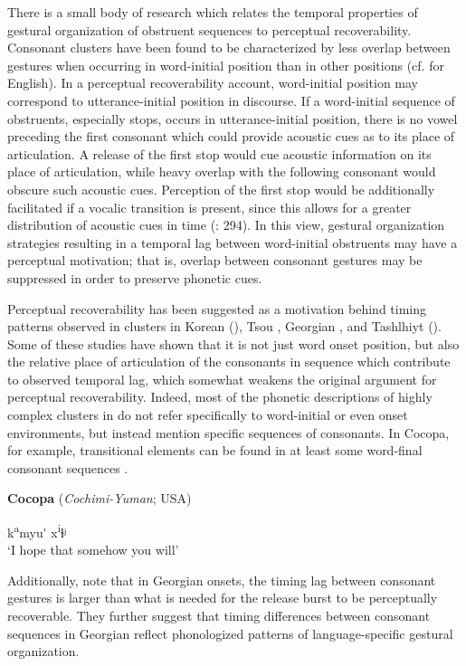   There is a small body of research which relates the temporal properties of gestural organization of obstruent sequences to perceptual recoverability. Consonant clusters have been found to be characterized by less overlap between gestures when occurring in word-initial position than in other positions (cf. \citealt{Byrd1996a} for English). In a perceptual recoverability account, word-initial position may correspond to utterance-initial position in discourse. If a word-initial sequence of obstruents, especially stops, occurs in utterance-initial position, there is no vowel preceding the first consonant which could provide acoustic cues as to its place of articulation. A release of the first stop would cue acoustic information on its place of articulation, while heavy overlap with the following consonant would obscure such acoustic cues. Perception of the first stop would be additionally facilitated if a vocalic transition is present, since this allows for a greater distribution of acoustic cues in time (\citealt{RidouaneFougeron2011}: 294). In this view, gestural organization strategies resulting in a temporal lag between word-initial obstruents may have a perceptual motivation; that is, overlap between consonant gestures may be suppressed in order to preserve phonetic cues.

  Perceptual recoverability has been suggested as a motivation behind timing patterns observed in clusters in Korean (\citealt{SilvermanJun1994}), Tsou \citep{Wright1996}, Georgian \citep{ChitoranEtAl2002}, and Tashlhiyt (\citealt{RidouaneFougeron2011}). Some of these studies have shown that it is not just word onset position, but also the relative place of articulation of the consonants in sequence which contribute to observed temporal lag, which somewhat weakens the original argument for perceptual recoverability. Indeed, most of the phonetic descriptions of highly complex clusters in  do not refer specifically to word-initial or even onset environments, but instead mention specific sequences of consonants. In Cocopa, for example, transitional elements can be found in at least some word-final consonant sequences .

\ea\label{ex:8.9}
  \textbf{Cocopa} (\textit{Cochimi-Yuman}; USA)

k\textsuperscript{a}myu\'{} x\textsuperscript{i}ɬʲ\\
\glt ‘I hope that somehow you will’
\citep[47]{Crawford1966}
\z

Additionally, \citet{ChitoranCohn2009} note that in Georgian onsets, the timing lag between consonant gestures is larger than what is needed for the release burst to be perceptually recoverable. They further suggest that timing differences between consonant sequences in Georgian reflect phonologized patterns of language-specific gestural organization.

